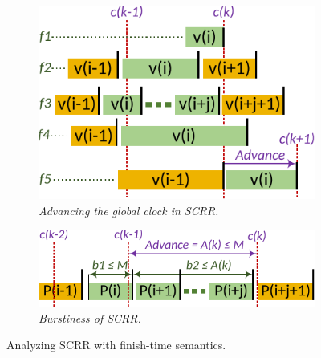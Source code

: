 \begin{figure}[t]
    \centering
    \begin{subfigure}[t]{.48\linewidth}
    \includegraphics[width=\linewidth]{figs/scrr-packet-advance-finish.pdf}
    \vspace{-2mm}
    \caption{\small{\textit{Advancing the global clock in SCRR.}}}
	\label{fig:global-clock-finish}
    \end{subfigure}
    \begin{subfigure}[t]{.48\linewidth}
    \includegraphics[width=\linewidth]{figs/scrr-packet-burst-finish.pdf}
    \vspace{-3mm}
    \caption{\small{\textit{Burstiness of SCRR.}}}
    \vspace{-3mm}
	\label{fig:burstiness-finish}
    \end{subfigure}
    \caption{\small{Analyzing SCRR with finish-time semantics.}}
 \vspace{-2mm}
\end{figure}
